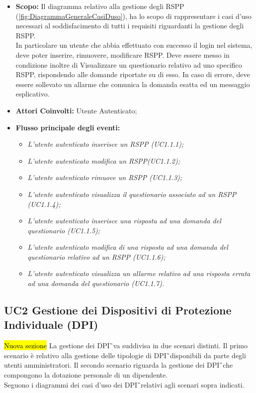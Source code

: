		\begin{itemize}
			\item \textbf{Scopo:} Il diagramma relativo alla gestione degli RSPP (\autoref{fig:DiagrammaGeneraleCasiDuso}), ha lo scopo di rappresentare i casi d'uso necessari al soddisfacimento di tutti i requisiti riguardanti la gestione degli RSPP. \\
			In particolare un utente che abbia effettuato con successo il login nel sistema, deve poter inserire, rimuovere, modificare  RSPP. Deve essere messo in condizione inoltre di Visualizzare un questionario relativo ad uno specifico RSPP, rispondendo alle domande riportate su di esso. In caso di errore, deve essere sollevato un allarme che comunica la domanda esatta ed un messaggio esplicativo.
			\item \textbf{Attori Coinvolti:} Utente Autenticato;
			\item \textbf{Flusso principale degli eventi:} 
			\begin{itemize}
				\item \textit{L'utente autenticato inserisce un RSPP (UC1.1.1);}
				\item \textit{L'utente autenticato modifica un RSPP(UC1.1.2);}
				\item \textit{L'utente autenticato rimuove un RSPP (UC1.1.3);}
				\item \textit{L'utente autenticato visualizza il questionario associato ad un RSPP (UC1.1.4);}
				\item \textit{L'utente autenticato inserisce una risposta ad una domanda del questionario (UC1.1.5);}
				\item \textit{L'utente autenticato modifica di una risposta ad una domanda del questionario relativo ad un RSPP (UC1.1.6);}
				\item \textit{ L'utente autenticato visualizza un allarme relativo ad una risposta errata ad una domanda del questionario (UC1.1.7).}
			\end{itemize}
		\end{itemize}
	\newpage	
	\subsection{UC2 Gestione dei Dispositivi di Protezione Individuale (DPI)}
		\label{section:UC2}
		\hl{Nuova sezione}
		La gestione dei  \gls{DPI}\G\ va suddivisa in due scenari distinti. Il primo scenario è relativo alla gestione delle tipologie di \gls{DPI}\G\ disponibili da parte degli utenti amministratori. Il secondo scenario riguarda la gestione dei \gls{DPI}\G\ che compongono la dotazione personale di un dipendente. \\
		Seguono i diagrammi dei casi d'uso dei \gls{DPI}\G\ relativi agli scenari sopra indicati.

